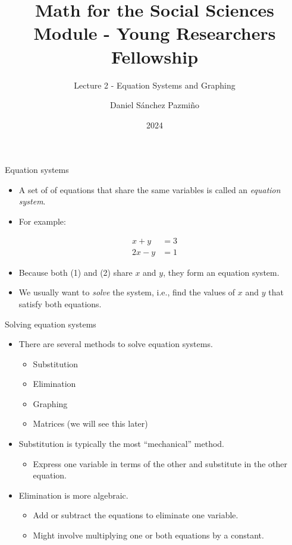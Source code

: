 \documentclass[
  10pt,
  ignorenonframetext,
]{beamer}
\title{Math for the Social Sciences Module - Young Researchers
Fellowship}
\subtitle{Lecture 2 - Equation Systems and Graphing}
\author{Daniel Sánchez Pazmiño}
\date{2024}
\institute{Laboratorio de Investigación para el Desarrollo del Ecuador}
\providecommand{\tightlist}{%
  \setlength{\itemsep}{0pt}\setlength{\parskip}{0pt}}\usepackage{longtable,booktabs,array}
\begin{document}
\frame{\titlepage}

\begin{frame}{Equation systems}
\label{equation-systems}
\begin{itemize}
\item
  A set of of equations that share the same variables is called an
  \emph{equation system}.
\item
  For example:
\end{itemize}

\begin{align}
x + y &= 3 \\
2x - y &= 1
\end{align}

\begin{itemize}
\item
  Because both (1) and (2) share \(x\) and \(y\), they form an equation
  system.
\item
  We usually want to \emph{solve} the system, i.e., find the values of
  \(x\) and \(y\) that satisfy both equations.
\end{itemize}
\end{frame}

\begin{frame}{Solving equation systems}
\label{solving-equation-systems}
\begin{itemize}
\tightlist
\item
  There are several methods to solve equation systems.

  \begin{itemize}
  \tightlist
  \item
    Substitution
  \item
    Elimination
  \item
    Graphing
  \item
    Matrices (we will see this later)
  \end{itemize}
\item
  Substitution is typically the most ``mechanical'' method.

  \begin{itemize}
  \tightlist
  \item
    Express one variable in terms of the other and substitute in the
    other equation.
  \end{itemize}
\item
  Elimination is more algebraic.

  \begin{itemize}
  \tightlist
  \item
    Add or subtract the equations to eliminate one variable.
  \item
    Might involve multiplying one or both equations by a constant.
  \end{itemize}
\end{itemize}
\end{frame}
\end{document}
